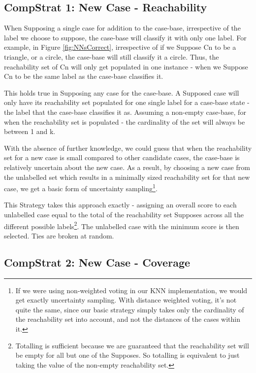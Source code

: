 \documentclass[a4paper,11pt]{report}
\begin{document}
\subsection{CompStrat 1: New Case - Reachability\label{sec:compstrat1}}
When Supposing a single case for addition to the case-base, irrespective of the label we choose to suppose, the case-base will classify it with only one label. For example, in Figure \ref{fig:NNsCorrect}, irrespective of if we Suppose Cn to be a triangle, or a circle, the case-base will still classify it a circle. Thus, the reachability set of Cn will only get populated in one instance - when we Suppose Cn to be the same label as the case-base classifies it.

This holds true in Supposing any case for the case-base. A Supposed case will only have its reachability set populated for one single label for a case-base state - the label that the case-base classifies it as. Assuming a non-empty case-base, for when the reachability set is populated - the cardinality of the set will always be between 1 and k.

With the absence of further knowledge, we could guess that when the reachability set for a new case is small compared to other candidate cases, the case-base is relatively uncertain about the new case. As a result, by choosing a new case from the unlabelled set which results in a minimally sized reachability set for that new case, we get a basic form of uncertainty sampling\footnote{If we were using non-weighted voting in our KNN implementation, we would get exactly uncertainty sampling. With distance weighted voting, it's not quite the same, since our basic strategy simply takes only the cardinality of the reachability set into account, and not the distances of the cases within it.}.

This Strategy takes this approach exactly - assigning an overall score to each unlabelled case equal to the total of the reachability set Supposes across all the different possible labels\footnote{Totalling is sufficient because we are guaranteed that the reachability set will be empty for all but one of the Supposes. So totalling is equivalent to just taking the value of the non-empty reachability set.}. The unlabelled case with the minimum score is then selected. Ties are broken at random.

\subsection{CompStrat 2: New Case - Coverage}
\end{document}

